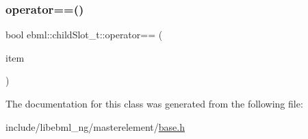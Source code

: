 \mbox{\label{classebml_1_1childSlot__t_aa6c541a6a2757beadce3ceeb1a4d2358}} 
\subsubsection{\texorpdfstring{operator==()}{operator==()}\hspace{0.1cm}{\footnotesize\ttfamily [3/3]}}
{\footnotesize\ttfamily bool ebml\+::child\+Slot\+\_\+t\+::operator== (\begin{DoxyParamCaption}\item[{const \mbox{\hyperlink{classebml_1_1childSlot__t}{child\+Slot\+\_\+t}} \&}]{item }\end{DoxyParamCaption})}



The documentation for this class was generated from the following file\+:\begin{DoxyCompactItemize}
\item 
include/libebml\+\_\+ng/masterelement/\mbox{\hyperlink{masterelement_2base_8h}{base.\+h}}\end{DoxyCompactItemize}

